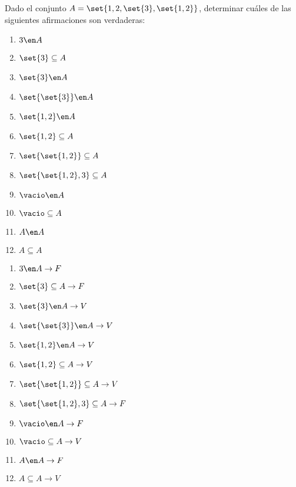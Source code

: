 \begin{enunciado}{\ejercicio}

  Dado el conjunto $A = \set{1,2,\set{3},\set{1,2}}$,
  determinar cuáles de las siguientes afirmaciones son verdaderas:

  \begin{multicols}{4}
    \begin{enumerate}[label=(\roman*)]
      \item $3 \en A         $
      \item $\set{3} \subseteq A $
      \item $\set{3} \en A    $
      \item $\set{\set{3}} \en A $
      \item $\set{1,2} \en A $
      \item $\set{1,2} \subseteq A  $
      \item $\set{\set{1,2}} \subseteq A  $
      \item $\set{\set{1,2}, 3} \subseteq A  $
      \item $\vacio \en A  $
      \item $\vacio \subseteq A  $
      \item $A \en A  $
      \item $A \subseteq A  $
    \end{enumerate}
  \end{multicols}

\end{enunciado}

\begin{multicols}{3}
  \begin{enumerate}[label=(\roman*)]
    \item $3 \en A       \to F  $
    \item $\set{3} \subseteq A \to F$
    \item $\set{3} \en A    \to V$
    \item $\set{\set{3}} \en A \to V$
    \item $\set{1,2} \en A \to V$
    \item $\set{1,2} \subseteq A \to V $
    \item $\set{\set{1,2}} \subseteq A \to V $
    \item ${\set{\set{1,2}, 3} \subseteq A \to F}$
    \item $\vacio \en A \to F $
    \item $\vacio \subseteq A \to V $
    \item $A \en A \to F $
    \item $A \subseteq A \to V $
  \end{enumerate}
\end{multicols}

\begin{aportes}
  \item {}
\end{aportes}
